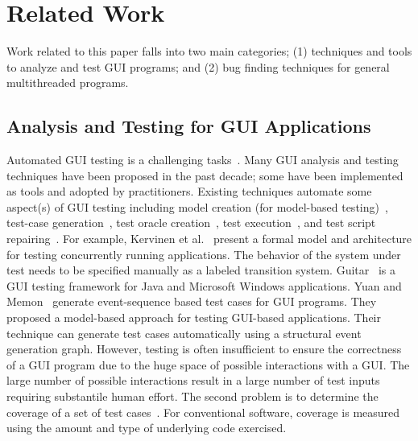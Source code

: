 \section{Related Work}

Work related to this paper falls into two main categories; (1)
techniques and tools to analyze and test GUI programs; and (2)
bug finding techniques for general multithreaded programs.

\subsection{Analysis and Testing for GUI Applications}

Automated GUI testing is a challenging tasks~\cite{Bertolino:2007:STR:1253532.1254712,
Harrold:2000:TR:336512.336532}.
 Many GUI analysis and testing techniques have been proposed in the past decade; some have been
implemented as tools and adopted by practitioners. Existing techniques automate
some aspect(s) of GUI testing including model creation
(for model-based testing)~\cite{androidtesting, Xie:2006:MTC:1172962.1172990},
test-case generation~\cite{YuanCohenMemonTSE2011, YuanMemonICSE2007},
test oracle creation~\cite{MemonFSE2000}, test execution~\cite{MemonFSE2001},
and test script repairing~\cite{Huang:2010:RGT:1828417.1828465, Daniel:2011:AGR:2002931.2002937}.
For example,
Kervinen et al.~\cite{Kervinen06model-basedtesting} present a formal model and architecture for testing
concurrently running applications. The behavior of the system under test
needs to be specified manually as a labeled transition system. 
Guitar~\cite{YuanCohenMemonTSE2011, YuanMemonICSE2007, Xie:2006:MTC:1172962.1172990}
is a GUI testing framework for Java and Microsoft Windows applications. 
Yuan and Memon~\cite{YuanMemonICSE2007} generate event-sequence based test cases for GUI
programs. They proposed a model-based approach for testing GUI-based applications.
Their technique can generate test cases automatically using a structural event
generation graph. 
However, testing is often insufficient to ensure the correctness of a GUI program
due to the huge space of possible interactions
with a GUI. The large number of possible interactions
result in a large number of
test inputs requiring substantile human effort.
The second
problem is to determine the coverage of a set of test
cases~\cite{MemonFSE2001}. For conventional software, coverage is measured
using the amount and type of underlying code exercised.
